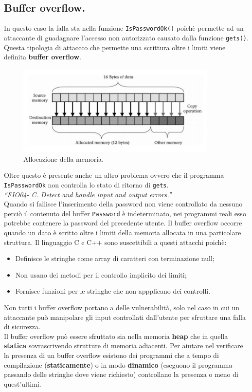\subsection{Buffer overflow.}
In questo caso la falla sta nella funzione \verb|IsPasswordOk()| poichè permette ad un attaccante di guadagnare l'accesso non autorizzato causato dalla funzione \verb|gets()|. Questa tipologia di attaccco che permette una scrittura oltre i limiti viene definita \textbf{buffer overflow}.

\begin{figure}[H]
    \centering
    \includegraphics[width=10cm, keepaspectratio]{capitoli/secure_coding/img/cap_2/memory.png}
    \caption{Allocazione della memoria.}\label{fig:memoria}
\end{figure}
Oltre questo è presente anche un altro problema ovvero che il programma \verb|IsPasswordOk| non controlla lo stato di ritorno di \verb|gets|. \\
\textit{“FIO04- C. Detect and handle input and output errors.”}\\
Quando si fallisce l'inserimento della password non viene controllato da nessuno perciò il contenuto del buffer \verb|Password| è indeterminato, nei programmi reali esso potrebbe contenere la password del precedente utente.
Il buffer overflow occorre quando un dato è scritto oltre i limiti della memoria allocata in una particolare struttura. Il linguaggio C e C++ sono suscettibili a questi attacchi poichè:
\begin{itemize}
    \item Definisce le stringhe come array di caratteri con terminazione null;
    \item Non usano dei metodi per il controllo implicito dei limiti;
    \item Fornisce funzioni per le stringhe che non appplicano dei controlli.
\end{itemize}
Non tutti i buffer overflow portano a delle vulnerabilità, solo nel caso in cui un attaccante può manipolare gli input controllati dall'utente per sfruttare una falla di sicurezza.\\
Il buffer overflow può essere sfruttato sia nella memoria \textbf{heap} che in quella \textbf{statica} sovrascrivendo strutture di memoria adiacenti. Per aiutare nel verificare la presenza di un buffer overflow esistono dei programmi che a tempo di compilazione (\textbf{staticamente}) o in modo \textbf{dinamico} (eseguono il programma passando delle stringhe dove viene richiesto) controllano la presenza o meno di quest'ultimi.

